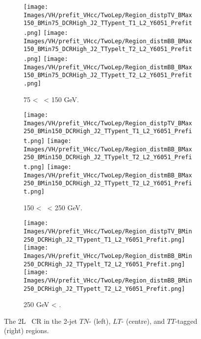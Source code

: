 \begin{figure}[h!]
    \centering
    \begin{subfigure}[b]{\textwidth}
        \centering
        \texttt{[image: Images/VH/prefit\_VHcc/TwoLep/Region\_distpTV\_BMax150\_BMin75\_DCRHigh\_J2\_TTypent\_T1\_L2\_Y6051\_Prefit.png]}
        \texttt{[image: Images/VH/prefit\_VHcc/TwoLep/Region\_distmBB\_BMax150\_BMin75\_DCRHigh\_J2\_TTypelt\_T2\_L2\_Y6051\_Prefit.png]}
        \texttt{[image: Images/VH/prefit\_VHcc/TwoLep/Region\_distmBB\_BMax150\_BMin75\_DCRHigh\_J2\_TTypett\_T2\_L2\_Y6051\_Prefit.png]}
        \caption{75 < \ptv\ < 150 GeV.}
        \label{fig:plots_VHcc_2L_75_CRH_2J}
    \end{subfigure}
    \begin{subfigure}[b]{\textwidth}
        \centering
        \texttt{[image: Images/VH/prefit\_VHcc/TwoLep/Region\_distpTV\_BMax250\_BMin150\_DCRHigh\_J2\_TTypent\_T1\_L2\_Y6051\_Prefit.png]}
        \texttt{[image: Images/VH/prefit\_VHcc/TwoLep/Region\_distmBB\_BMax250\_BMin150\_DCRHigh\_J2\_TTypelt\_T2\_L2\_Y6051\_Prefit.png]}
        \texttt{[image: Images/VH/prefit\_VHcc/TwoLep/Region\_distmBB\_BMax250\_BMin150\_DCRHigh\_J2\_TTypett\_T2\_L2\_Y6051\_Prefit.png]}
        \caption{150 < \ptv\ < 250 GeV.}
        \label{fig:plots_VHcc_2L_150_CRH_2J}
    \end{subfigure}
    \begin{subfigure}[b]{\textwidth}
        \centering
        \texttt{[image: Images/VH/prefit\_VHcc/TwoLep/Region\_distpTV\_BMin250\_DCRHigh\_J2\_TTypent\_T1\_L2\_Y6051\_Prefit.png]}
        \texttt{[image: Images/VH/prefit\_VHcc/TwoLep/Region\_distmBB\_BMin250\_DCRHigh\_J2\_TTypelt\_T2\_L2\_Y6051\_Prefit.png]}
        \texttt{[image: Images/VH/prefit\_VHcc/TwoLep/Region\_distmBB\_BMin250\_DCRHigh\_J2\_TTypett\_T2\_L2\_Y6051\_Prefit.png]}
        \caption{250 GeV < \ptv.}
        \label{fig:plots_VHcc_2L_250_CRH_2J}
    \end{subfigure}
    \caption{The 2L \highdr\ CR in the 2-jet $TN$- (left), $LT$- (centre), and $TT$-tagged (right) regions.}
    \label{fig:plots_VHcc_2L_CRH_2J}
\end{figure}

\vspace*{\fill} \newpage
\vspace*{\fill} 

